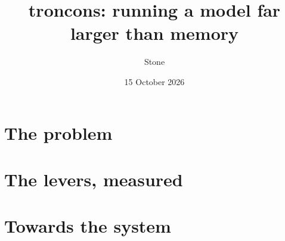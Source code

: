 \documentclass[11pt, a4paper, twoside, openright, parskip=false, headings=big,
               chapterprefix=true, numbers=noenddot, bibliography=totoc,
               listof=totoc]{scrbook}
\title{troncons: running a model far larger than memory}
\author{Stone}
\date{15 October 2026}
\begin{document}
\frontmatter


\tableofcontents
\listoffigures
\listoftables
\lstlistoflistings


\mainmatter
\part{The problem}





\part{The levers, measured}






\part{Towards the system}




\appendix




\backmatter
\printbibliography[heading=bibintoc, title={Bibliography}]
\end{document}
